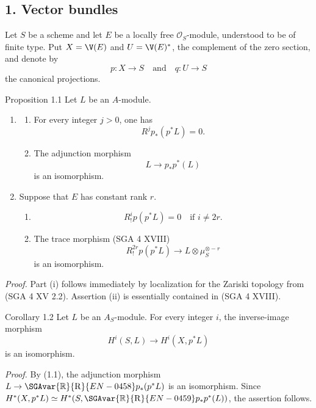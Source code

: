 \subsection*{1. Vector bundles}

Let $S$ be a scheme and let $E$ be a locally free $\mathcal O_S$-module, understood to be of finite type. Put $X=\V(E)$ and $U=\V(E)^*$, the complement of the zero section, and denote by
\[
p:X\to S
\quad\text{and}\quad
q:U\to S
\]
the canonical projections.

\begin{statement}{Proposition 1.1}
Let $L$ be an $A$-module.
\begin{enumerate}[label=(\roman*)]
\item
\begin{enumerate}[label=\alph*)]
\item For every integer $j>0$, one has
\[
R^j p_*(p^*L)=0.
\]
\item The adjunction morphism
\[
L\longrightarrow p_*p^*(L)
\]
is an isomorphism.
\end{enumerate}
\item Suppose that $E$ has constant rank $r$.
\begin{enumerate}[label=\alph*)]
\item
\[
R_!^i p(p^*L)=0\quad\text{if }i\ne 2r.
\]
\item The trace morphism (SGA 4 XVIII)
\[
R_!^{2r}p(p^*L)\longrightarrow L\otimes\mu_S^{\otimes -r}
\]
is an isomorphism.
\end{enumerate}
\end{enumerate}
\end{statement}

\emph{Proof.} Part (i) follows immediately by localization for the Zariski topology from (SGA 4 XV 2.2). Assertion (ii) is essentially contained in (SGA 4 XVIII).

\begin{statement}{Corollary 1.2}
Let $L$ be an $A_S$-module. For every integer $i$, the inverse-image morphism
\[
H^i(S,L)\longrightarrow H^i(X,p^*L)
\]
is an isomorphism.
\end{statement}

\emph{Proof.} By (1.1), the adjunction morphism $L\to \SGAvar{\mathbb{R}}{\mathrm{R}}{EN-0458}p_*(p^*L)$ is an isomorphism. Since $H^*(X,p^*L)\simeq H^*(S,\SGAvar{\mathbb{R}}{\mathrm{R}}{EN-0459}p_*p^*(L))$, the assertion follows.

